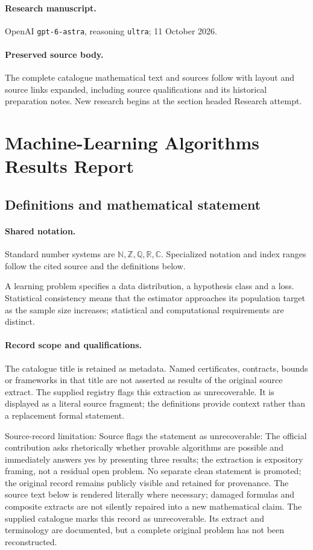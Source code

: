 \documentclass[11pt]{article}
\begin{document}
\paragraph{Research manuscript.} OpenAI \texttt{gpt-6-astra}, reasoning \texttt{ultra}; 11 October 2026.
\paragraph{Preserved source body.} The complete catalogue mathematical text and sources follow with layout and source links expanded, including source qualifications and its historical preparation notes. New research begins at the section headed Research attempt.

\section{Machine-Learning Algorithms Results Report}\label{statement}

\subsection{Definitions and mathematical statement}

\paragraph{Shared notation.}Standard number systems are $\mathbb N,\mathbb Z,\mathbb Q,\mathbb R,\mathbb C$. Specialized notation and index ranges follow the cited source and the definitions below.


A learning problem specifies a data distribution, a hypothesis class and a loss. Statistical consistency means that the estimator approaches its population target as the sample size increases; statistical and computational requirements are distinct.
\paragraph{Record scope and qualifications.}
The catalogue title is retained as metadata. Named certificates, contracts, bounds or frameworks in that title are not asserted as results of the original source extract.
The supplied registry flags this extraction as unrecoverable. It is displayed as a literal source fragment; the definitions provide context rather than a replacement formal statement.

Source-record limitation: Source flags the statement as unrecoverable: The official contribution asks rhetorically whether provable algorithms are possible and immediately answers yes by presenting three results; the extraction is expository framing, not a residual open problem. No separate clean statement is promoted; the original record remains publicly visible and retained for provenance.
The source text below is rendered literally where necessary; damaged formulas and composite extracts are not silently repaired into a new mathematical claim.
The supplied catalogue marks this record as unrecoverable. Its extract and terminology are documented, but a complete original problem has not been reconstructed.
\end{document}
